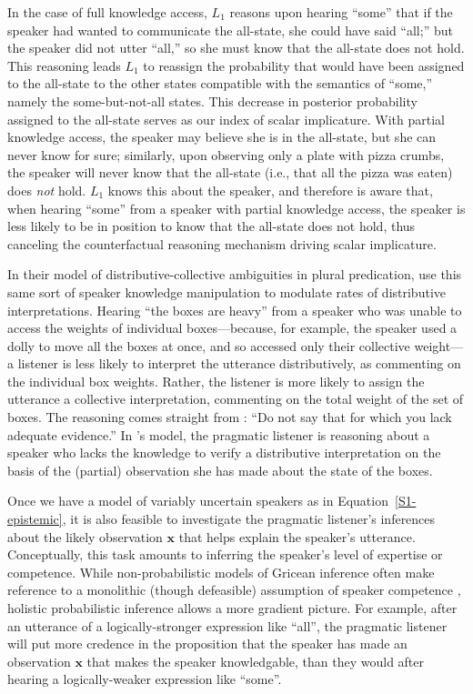 \documentclass{sp}
\begin{document}
In the case of full knowledge access, $L_1$ reasons upon hearing ``some'' that if the speaker had wanted to communicate the all-state, she could have said ``all;'' but the speaker did not utter ``all,'' so she must know that the all-state does not hold. This reasoning leads $L_1$ to reassign the probability that would have been assigned to the all-state to the other states compatible with the semantics of ``some,'' namely the some-but-not-all states. This decrease in posterior probability assigned to the all-state serves as our index of scalar implicature. With partial knowledge access, the speaker may believe she is in the all-state, but she can never know for sure; similarly, upon observing only a plate with pizza crumbs, the speaker will never know that the all-state (i.e., that all the pizza was eaten) does \emph{not} hold. $L_1$ knows this about the speaker, and therefore is aware that, when hearing ``some'' from a speaker with partial knowledge access, the speaker is less likely to be in position to know that the all-state does not hold, thus canceling the counterfactual reasoning mechanism driving scalar implicature.

In their model of distributive-collective ambiguities in plural predication, \cite{scontrasgoodman2017} use this same sort of speaker knowledge manipulation to modulate rates of distributive interpretations. Hearing ``the boxes are heavy'' from a speaker who was unable to access the weights of individual boxes---because, for example, the speaker used a dolly to move all the boxes at once, and so accessed only their collective weight---a listener is less likely to interpret the utterance distributively, as commenting on the individual box weights. Rather, the listener is more likely to assign the utterance a collective interpretation, commenting on the total weight of the set of boxes. The reasoning comes straight from \cite{Grice1975:Logic-and-Conve}: ``Do not say that for which you lack adequate evidence.'' In \citeauthor{scontrasgoodman2017}'s model, the pragmatic listener is reasoning about a speaker who lacks the knowledge to verify a distributive interpretation on the basis of the (partial) observation she has made about the state of the boxes.

Once we have a model of variably uncertain speakers as in Equation~\eqref{S1-epistemic}, it is also feasible to investigate the pragmatic listener's inferences about the likely observation $\textbf{x}$ that helps explain the speaker's utterance.
Conceptually, this task amounts to inferring the speaker's level of expertise or competence.
While non-probabilistic models of Gricean inference often make reference to a monolithic (though defeasible) assumption of speaker competence \citep{Geurts2010:Quantity-Implic,vanRooijSchulz:ExhaustiveInterpretation,Spector2006:Scalar-Implicat}, holistic probabilistic inference allows a more gradient picture.
For example, after an utterance of a logically-stronger expression like ``all'', the pragmatic listener will put more credence in the proposition that the speaker has made an observation $\textbf{x}$ that makes the speaker knowledgable, than they would after hearing a logically-weaker expression like ``some''.
\end{document}
